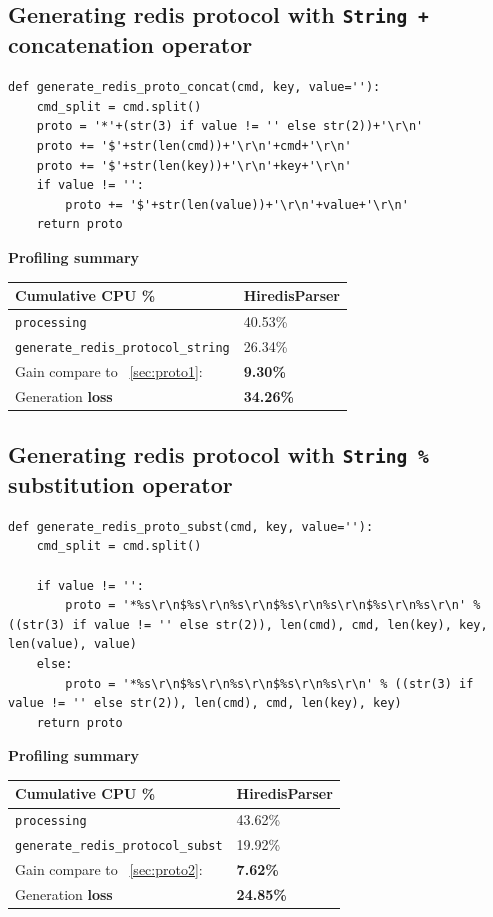 \documentclass[a4paper, 11pt]{report}
\begin{document}
\subsection{Generating redis protocol with \texttt{String +} concatenation operator\label{sec:proto2}}

\begin{lstlisting}
def generate_redis_proto_concat(cmd, key, value=''):
    cmd_split = cmd.split()
    proto = '*'+(str(3) if value != '' else str(2))+'\r\n'
    proto += '$'+str(len(cmd))+'\r\n'+cmd+'\r\n'
    proto += '$'+str(len(key))+'\r\n'+key+'\r\n'
    if value != '':
        proto += '$'+str(len(value))+'\r\n'+value+'\r\n'
    return proto
\end{lstlisting}

\textbf{Profiling summary}\\

\begin{tabular}{|l|l|}
    \hline
    Cumulative CPU \% & HiredisParser\\
    \hline
    \texttt{processing} & 40.53\%\\
    \hline
    \texttt{generate\_redis\_protocol\_string} & 26.34\%\\
    \hline
    Gain compare to ~\ref{sec:proto1}: & \textbf{9.30\%}\\
    \hline
    Generation \textbf{loss}  & \textbf{34.26\%}\\
    \hline
\end{tabular}


\subsection{Generating redis protocol with \texttt{String \%} substitution operator\label{sec:proto3}}

\begin{lstlisting}
def generate_redis_proto_subst(cmd, key, value=''):
    cmd_split = cmd.split()

    if value != '':
        proto = '*%s\r\n$%s\r\n%s\r\n$%s\r\n%s\r\n$%s\r\n%s\r\n' % ((str(3) if value != '' else str(2)), len(cmd), cmd, len(key), key, len(value), value)
    else:
        proto = '*%s\r\n$%s\r\n%s\r\n$%s\r\n%s\r\n' % ((str(3) if value != '' else str(2)), len(cmd), cmd, len(key), key)
    return proto
\end{lstlisting}

\textbf{Profiling summary}\\

\begin{tabular}{|l|l|}
    \hline
    Cumulative CPU \% & HiredisParser\\
    \hline
    \texttt{processing} & 43.62\%\\
    \hline
    \texttt{generate\_redis\_protocol\_subst} & 19.92\%\\
    \hline
    Gain compare to ~\ref{sec:proto2}: & \textbf{7.62\%} \\
    \hline
    Generation \textbf{loss}  & \textbf{24.85\%}\\
    \hline
\end{tabular}
\end{document}
